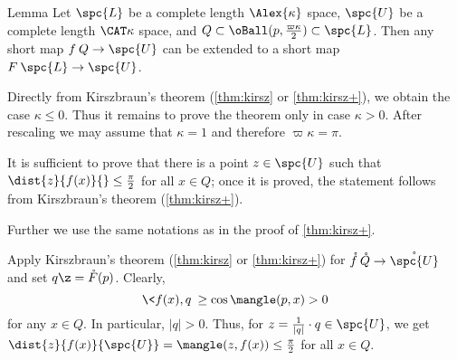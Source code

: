 \begin{thm}{Lemma}\label{cor:kir-from-hemisphere}%
Let $\spc{L}$ be a complete length $\Alex{\kappa}$ space, 
$\spc{U}$ be a complete length $\CAT\kappa$ space,
and $Q\subset \oBall(p,\tfrac{\varpi\kappa}2)\subset \spc{L}$.
Then any short map $f\:Q\to \spc{U}$ can be extended to a short map 
$F\:\spc{L}\to \spc{U}$.
\end{thm}

 Directly from Kirszbraun's theorem (\ref{thm:kirsz} or \ref{thm:kirsz+}), we obtain the case $\kappa\le 0$. 
Thus it remains to prove the theorem only in case $\kappa>0$.
After rescaling we may assume that $\kappa=1$
and therefore $\varpi\kappa=\pi$.

It is sufficient to prove that there is a point $z\in \spc{U}$ such that $\dist{z}{f(x)}{}\le \tfrac\pi2$ for all $x\in Q$; once it is proved, the statement follows from Kirszbraun's theorem (\ref{thm:kirsz+}).

Further we use the same notations as in the proof of \ref{thm:kirsz+}. 

Apply Kirszbraun's theorem (\ref{thm:kirsz} or \ref{thm:kirsz+}) for $\mathring f\:\mathring Q\to\mathring{\spc{U}}$ and set $q\z={\mathring F}(p)$.
Clearly,
\[\<f(x),q\>
\ge 
\cos\mangle(p,x)>0\]
for any $x\in Q$.
In particular, $|q|>0$. 
Thus, for $z=\tfrac{1}{|q|}\cdot q\in\spc{U}$,
we get $\dist{z}{f(x)}{\spc{U}}=\mangle(z,f(x))\le \tfrac{\pi}{2}$ for all $x\in Q$.
\qeds


